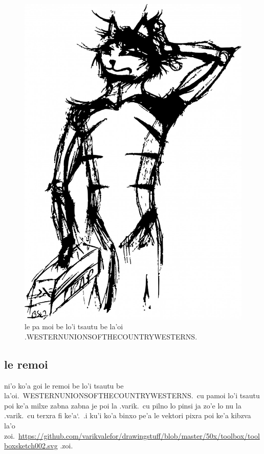 \documentclass{report}
\newcommand\sds{\spacefactor\sfcode`.\ \space}
\begin{document}
\begin{figure}[ht]
	\centering
	\includegraphics[keepaspectratio, width=\textwidth, height=0.75\textheight]{50x/toolbox/s1v1.jpg}
	\caption[center]{le pa moi be lo'i tsautu be la'oi .WESTERNUNIONSOFTHECOUNTRYWESTERNS.}
\end{figure}
\subsection{le remoi}
ni'o ko'a goi le remoi be lo'i tsautu be la'oi.\ WESTERNUNIONSOFTHECOUNTRYWESTERNS.\ cu pamoi lo'i tsautu poi ke'a milxe zabna zabna je poi la .varik.\ cu pilno lo pinsi ja zo'e lo nu la .varik.\ cu terxra fi ke'a\sds  .i ku'i ko'a binxo pe'a le vektori pixra poi ke'a kibzva la'o zoi.\ \url{https://github.com/varikvalefor/drawingstuff/blob/master/50x/toolbox/toolboxsketch002.svg} .zoi.
\end{document}
